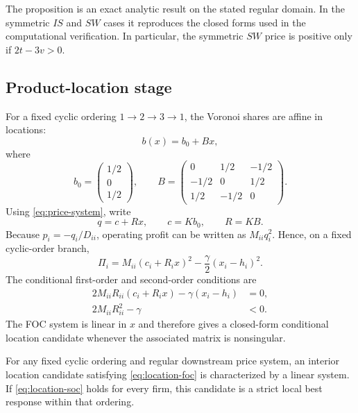 The proposition is an exact analytic result on the stated regular domain. In the symmetric $IS$ and $SW$ cases it reproduces the closed forms used in the computational verification. In particular, the symmetric $SW$ price is positive only if $2t-3v>0$.

\subsection{Product-location stage}

For a fixed cyclic ordering $1\to2\to3\to1$, the Voronoi shares are affine in locations:
\begin{equation}\label{eq:b-linear}
b(x)=b_0+Bx,
\end{equation}
where
\[
b_0=\begin{pmatrix}1/2\\0\\1/2\end{pmatrix},
\qquad
B=\begin{pmatrix}
0&1/2&-1/2\\
-1/2&0&1/2\\
1/2&-1/2&0
\end{pmatrix}.
\]
Using \eqref{eq:price-system}, write
\[
q=c+Rx,
\qquad c=Kb_0,
\qquad R=KB.
\]
Because $p_i=-q_i/D_{ii}$, operating profit can be written as $M_{ii}q_i^2$. Hence, on a fixed cyclic-order branch,
\begin{equation}\label{eq:location-profit}
\Pi_i=M_{ii}(c_i+R_ix)^2-\frac\gamma2(x_i-h_i)^2.
\end{equation}
The conditional first-order and second-order conditions are
\begin{align}
2M_{ii}R_{ii}(c_i+R_ix)-\gamma(x_i-h_i)&=0,\label{eq:location-foc}\\
2M_{ii}R_{ii}^2-\gamma&<0.\label{eq:location-soc}
\end{align}
The FOC system is linear in $x$ and therefore gives a closed-form conditional location candidate whenever the associated matrix is nonsingular.

\begin{proposition}\label{prop:location}
For any fixed cyclic ordering and regular downstream price system, an interior location candidate satisfying \eqref{eq:location-foc} is characterized by a linear system. If \eqref{eq:location-soc} holds for every firm, this candidate is a strict local best response within that ordering.
\end{proposition}

